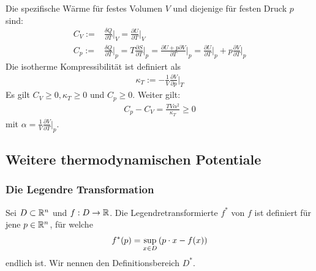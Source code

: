 \begin{definition}
    Die spezifische Wärme für festes Volumen $V$ und diejenige für
    festen Druck $p$ sind:
    \begin{align*}
        C_V :=& \frac{\delta Q}{\partial T} \Big|_{V}
        = \frac{\partial U}{\partial T} \Big|_{V}
        \\
        C_p :=& \frac{\delta Q}{\partial T} \Big|_{p}
            = T \frac{\partial S}{\partial T} \Big|_{p}
            = \frac{\partial U + p \partial V}{\partial T} \Big|_{p}
            = \frac{\partial U}{\partial T} \Big|_{p} + p \frac{\partial V}{\partial T} \Big|_{p}
    \end{align*}
    Die isotherme Kompressibilität ist definiert als
    \begin{align*}
        \kappa_T := - \frac{1}{V} \frac{\partial V}{\partial p} \Big|_{T}
    \end{align*}
    Es gilt $C_V \geq 0, \kappa_T \geq 0$ und $C_p \geq 0$. Weiter gilt:
    \begin{align*}
        C_p - C_V = \frac{T V \alpha^2}{\kappa_T} \geq 0
    \end{align*}
    mit $\alpha = \frac{1}{V} \frac{\partial V}{\partial T} \Big|_p$.
\end{definition}


\subsection{Weitere thermodynamischen Potentiale}

\subsubsection{Die Legendre Transformation}

\begin{definition}[Legendretransformierte]
    Sei $D \subset \mathbb{R}^n$ und $f: D \rightarrow \mathbb{R}$. Die Legendretransformierte
    $f^\ast$ von $f$ ist definiert für jene $p \in \mathbb{R}^n$, für welche
    \begin{align*}
        f^\ast (p) = \sup_{x \in D} \left(  p \cdot x - f(x) \right)
    \end{align*}
    endlich ist. Wir nennen den Definitionsbereich $D^\ast$.
\end{definition}


